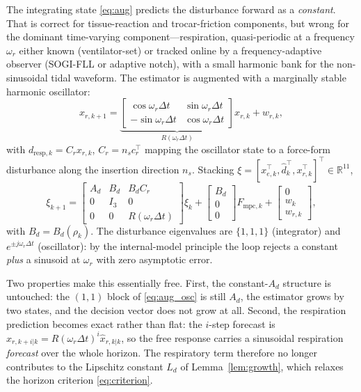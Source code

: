 The integrating state \eqref{eq:aug} predicts the disturbance forward as a \emph{constant}. That is correct for tissue-reaction and trocar-friction components, but wrong for the dominant time-varying component---respiration, quasi-periodic at a frequency $\omega_r$ either known (ventilator-set) or tracked online by a frequency-adaptive observer (SOGI-FLL or adaptive notch), with a small harmonic bank for the non-sinusoidal tidal waveform. The estimator is augmented with a marginally stable harmonic oscillator:
\begin{equation}
x_{r,k+1} = \underbrace{\begin{bmatrix} \cos\omega_r\Delta t & \sin\omega_r\Delta t \\ -\sin\omega_r\Delta t & \cos\omega_r\Delta t \end{bmatrix}}_{R(\omega_r\Delta t)} x_{r,k} + w_{r,k},
\label{eq:osc}
\end{equation}
with $d_{\text{resp},k} = C_r x_{r,k}$, $C_r = n_s c_r^\top$ mapping the oscillator state to a force-form disturbance along the insertion direction $n_s$. Stacking $\xi = [x_{e,k}^\top, \hat{d}_{k}^\top, x_{r,k}^\top]^\top \in \mathbb{R}^{11}$,
\begin{equation}
\xi _{k+1} = \begin{bmatrix} A_d & B_d & B_d C_r \\ 0 & I_3 & 0 \\ 0 & 0 & R(\omega_r\Delta t) \end{bmatrix} \xi _k + \begin{bmatrix} B_d \\ 0 \\ 0 \end{bmatrix} F_{\text{mpc},k} + \begin{bmatrix} 0 \\ w_k \\ w_{r,k} \end{bmatrix},
\label{eq:aug_osc}
\end{equation}
with $B_d = B_d(\rho_k)$. The disturbance eigenvalues are $\{1,1,1\}$ (integrator) and $e^{\pm j\omega_r\Delta t}$ (oscillator): by the internal-model principle the loop rejects a constant \emph{plus} a sinusoid at $\omega_r$ with zero asymptotic error.

Two properties make this essentially free. First, the constant-$A_d$ structure is untouched: the $(1,1)$ block of \eqref{eq:aug_osc} is still $A_d$, the estimator grows by two states, and the decision vector does not grow at all. Second, the respiration prediction becomes exact rather than flat: the $i$-step forecast is $\hat{x}_{r,k+i|k} = R(\omega_r\Delta t)^i \hat{x}_{r,k|k}$, so the free response carries a sinusoidal respiration \emph{forecast} over the whole horizon. The respiratory term therefore no longer contributes to the Lipschitz constant $L_d$ of Lemma~\ref{lem:growth}, which relaxes the horizon criterion \eqref{eq:criterion}.

